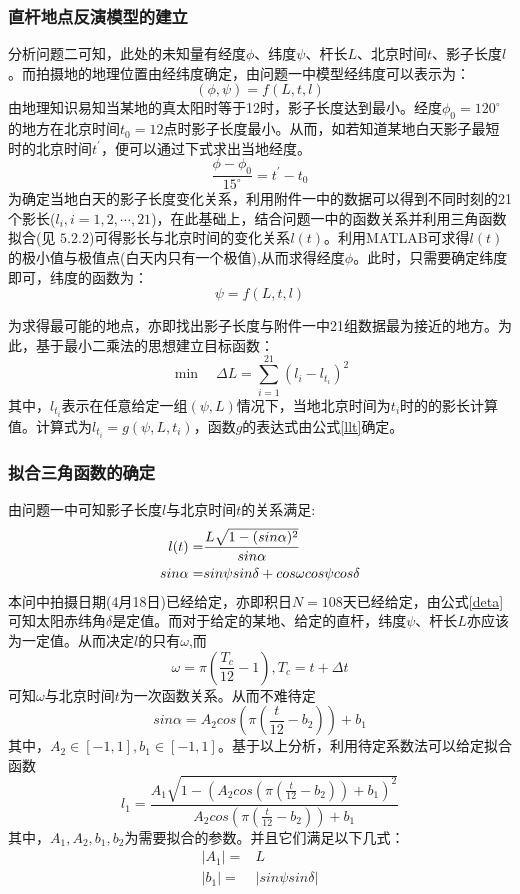 \documentclass[12pt]{cumcmart}   %
\begin{document}
\subsubsection{直杆地点反演模型的建立}
分析问题二可知，此处的未知量有经度$\phi$、纬度$\psi$、杆长$L$、北京时间$t$、影子长度$l$。而拍摄地的地理位置由经纬度确定，由问题一中模型经纬度可以表示为：
\begin{equation}
(\phi,\psi)=f(L,t,l)  
\end{equation}
由地理知识易知当某地的真太阳时等于12时，影子长度达到最小。经度$\phi_0=120^\circ$的地方在北京时间$t_0=12$点时影子长度最小。从而，如若知道某地白天影子最短时的北京时间$t^{'}$，便可以通过下式求出当地经度。
\begin{equation}
\frac{\phi-\phi_0}{15^\circ}=t^{'}-t_0   \label{suanjingdu}
\end{equation}
为确定当地白天的影子长度变化关系，利用附件一中的数据可以得到不同时刻的21个影长($l_i,i=1,2,\cdots,21$)，在此基础上，结合问题一中的函数关系并利用三角函数拟合(见 $5.2.2$)可得影长与北京时间的变化关系$l(t)$。利用MATLAB可求得$l(t)$的极小值与极值点(白天内只有一个极值),从而求得经度$\phi$。此时，只需要确定纬度即可，纬度的函数为：
\begin{equation}
\psi=f(L,t,l)
\label{llt}
\end{equation}

为求得最可能的地点，亦即找出影子长度与附件一中21组数据最为接近的地方。为此，基于最小二乘法的思想建立目标函数：
\begin{equation}
\min \quad \Delta L = \sum\limits_{i = 1}^{21} ({l_i}-l_{t_i})^2
\end{equation}
其中，$l_{t_i}$表示在任意给定一组$(\psi,L)$情况下，当地北京时间为$t_i$时的的影长计算值。计算式为$l_{t_i}=g(\psi,L,t_i)$，函数$g$的表达式由公式\ref{llt}确定。

\subsubsection{拟合三角函数的确定}  
由问题一中可知影子长度$l$与北京时间$t$的关系满足:
\begin{align}
l(t)=&\frac{L\sqrt{1-(sin\alpha)^2}}{sin\alpha}  \notag \label{lalpha} \\
sin \alpha=&sin \psi sin\delta +cos \omega cos \psi cos \delta \notag
\end{align}
本问中拍摄日期(4月18日)已经给定，亦即积日$N=108$天已经给定，由公式\ref{deta}可知太阳赤纬角$\delta$是定值。而对于给定的某地、给定的直杆，纬度$\psi$、杆长$L$亦应该为一定值。从而决定$l$的只有$\omega$,而
\[\omega=\pi (\frac{T_c}{12}-1),T_c=t+\Delta t\]
可知$\omega$与北京时间$t$为一次函数关系。从而不难待定
\[sin \alpha =A_2cos(\pi(\frac{t}{12}-b_2))+b_1\]
其中，$A_2 \in [-1,1],b_1 \in [-1,1]$。基于以上分析，利用待定系数法可以给定拟合函数
\begin{equation}
l_1=\frac{A_1\sqrt{1-(A_2cos(\pi(\frac{t}{12}-b_2))+b_1)^2}}{A_2cos(\pi(\frac{t}{12}-b_2))+b_1}
\end{equation}
其中，$A_1,A_2,b_1,b_2$为需要拟合的参数。并且它们满足以下几式：
\begin{align}
|A_1|=&L  \\ \label{niding1}
|b_1|=&|sin\psi sin\delta |  
\end{align}
\end{document}
